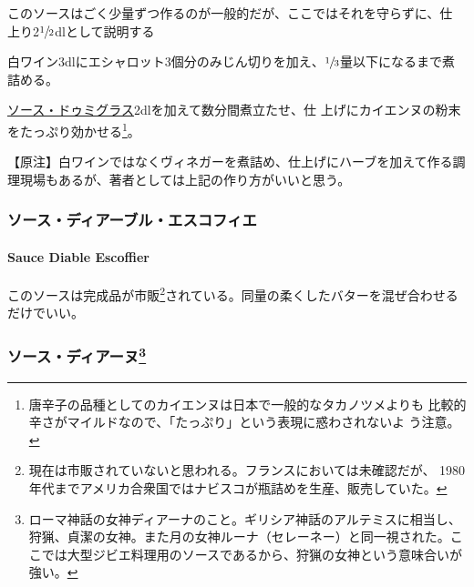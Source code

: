 \documentclass[twoside,12Q,b5j]{escoffierltjsbook}
\newenvironment{recette}{\begin{small}\begin{spacing}{1}\begin{multicols}{2}}{\end{multicols}\end{spacing}\end{small}}
\begin{document}
\begin{recette}

このソースはごく少量ずつ作るのが一般的だが、ここではそれを守らずに、仕
上り2\(\sfrac{1}{2}\)dlとして説明する

白ワイン3dlにエシャロット3個分のみじん切りを加え、\(\sfrac{1}{3}\)量以下になるまで煮詰める。

\protect\hyperlink{sauce-demi-glace}{ソース・ドゥミグラス}2dlを加えて数分間煮立たせ、仕
上げにカイエンヌの粉末をたっぷり効かせる\footnote{唐辛子の品種としてのカイエンヌは日本で一般的なタカノツメよりも
  比較的辛さがマイルドなので、「たっぷり」という表現に惑わされないよ
  う注意。}。

【原注】白ワインではなくヴィネガーを煮詰め、仕上げにハーブを加えて作る調理現場もあるが、著者としては上記の作り方がいいと思う。

\vspace*{1.7\zw}

\subsubsection{ソース・ディアーブル・エスコフィエ}\label{ux30bdux30fcux30b9ux30c7ux30a3ux30a2ux30fcux30d6ux30ebux30a8ux30b9ux30b3ux30d5ux30a3ux30a8}

\paragraph{Sauce Diable Escoffier}\label{sauce-diable-escoffier}


このソースは完成品が市販\footnote{現在は市販されていないと思われる。フランスにおいては未確認だが、
  1980年代までアメリカ合衆国ではナビスコが瓶詰めを生産、販売していた。}されている。同量の柔くしたバターを混ぜ合わせるだけでいい。

\vspace*{1.7\zw}

\subsubsection[ソース・ディアーヌ]{\texorpdfstring{ソース・ディアーヌ\footnote{ローマ神話の女神ディアーナのこと。ギリシア神話のアルテミスに相当し、狩猟、貞潔の女神。また月の女神ルーナ（セレーネー）と同一視された。ここでは大型ジビエ料理用のソースであるから、狩猟の女神という意味合いが強い。}}{ソース・ディアーヌ}}\label{ux30bdux30fcux30b9ux30c7ux30a3ux30a2ux30fcux30cc28}


\end{recette}
\end{document}

